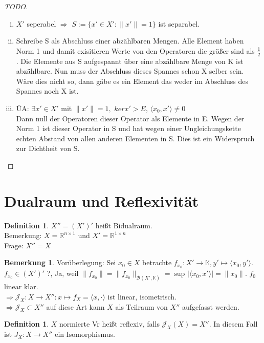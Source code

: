 \documentclass[ngerman]{report}
\theoremstyle{plain}%
\theoremstyle{definition}%
\newtheorem{definition}[thm]{Definition}
\theoremstyle{myStyle}
\newtheorem{bem}[thm]{Bemerkung}
\newcommand{\R}{\mathbb{R}}
\newcommand{\K}{\mathbb{K}}
\newcommand{\B}{\mathcal{B}} %
\newcommand{\norm}[1]{\|#1\|}
\newcommand{\df}[1][]{%
	\overset{#1}{\Rightarrow}
}
\newcommand{\set}[1]{\{#1\}}
\begin{document}
	\begin{proof}[TODO]
		\begin{enumerate}[(i)]
			\item $X'$ seperabel $\df$ $S := \set{x' \in X': \norm{x'} = 1}$ ist separabel.
			\item Schreibe S als Abschluss einer abzählbaren Mengen. Alle Element haben Norm 1 und damit exisitieren Werte von den Operatoren die größer sind als $\frac{1}{2}$. Die Elemente aus S aufgespannt über eine abzählbare Menge von K ist abzählbare. Nun muss der Abschluss dieses Spannes schon X selber sein. 
			Wäre dies nicht so, dann gäbe es ein Element das weder im Abschluss des Spannes noch X ist.
			\item ÜA: $\exists x' \in X'$ mit $\norm{x'} = 1,$ $ker x' > E$, $\langle x_0, x' \rangle \neq 0$ \\
			Dann null der Operatoren dieser Operator als Elemente in E. Wegen der Norm 1 ist dieser Operator in S und hat wegen einer Ungleichungskette echten Abstand von allen anderen Elementen in S. Dies ist ein Widerspruch zur Dichtheit von S. 
		\end{enumerate}

	\end{proof}

\section{Dualraum und Reflexivität}

		\begin{definition}
			$X'' = (X')' $ heißt Bidualraum. \\
			Bemerkung: $X = \R^{n\times 1}$ und $X' = \R^{1 \times n}$ \\
			Frage: $X'' = X$	
		\end{definition}

		\begin{bem}
		Vorüberlegung: Sei $x_0 \in X$ betrachte $f_{x_0}: X' \to \K, y' \mapsto \langle x_0, y' \rangle$. 
		$f_{x_0} \in (X')'$ ?, Ja, weil $\norm{f_{x_0}} = \norm{f_{x_0}}_{\B(X',\K)} = \sup_{}|\langle  x_0, x' \rangle| = \norm{x_0}$. $f_0$ linear klar. \\
		$\df \mathcal{J}_{X}: X \to X'': x \mapsto f_X = \langle x, \cdot \rangle$ ist linear, isometrisch. \\ 
		$\df \mathcal{J}_X \subset X''$ auf diese Art kann $X$ als Teilraum von $X''$ aufgefasst werden.
		\end{bem}

	\begin{definition}
		$X$ normierte Vr heißt reflexiv, falls $\mathcal{J}_X(X) = X''$. In diesem Fall ist $J_X :X \to X''$ ein Isomorphismus.
	\end{definition}
\end{document}

